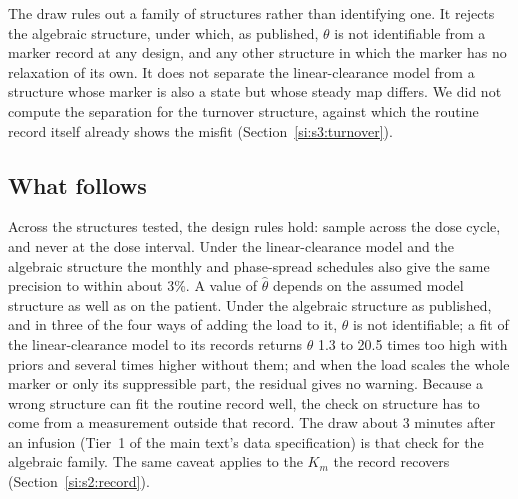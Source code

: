 The draw rules out a family of structures rather than identifying one. It rejects the algebraic
structure, under which, as published, $\theta$ is not identifiable from a marker record at any
design, and any other structure in which the marker has no relaxation of its own. It does not
separate the linear-clearance model from a structure whose marker is also a state but whose
steady map differs. We did not compute the separation for the turnover structure, against
which the routine record itself already shows the misfit
(Section~\ref{si:s3:turnover}).

\subsection{What follows}
\label{si:s3:follows}

Across the structures tested, the design rules hold: sample across the dose cycle, and never at
the dose interval. Under the linear-clearance model and the algebraic structure the monthly and
phase-spread schedules also give the same precision to within about 3\%. A value of $\hat\theta$ depends on the assumed model structure as well as on the patient.
Under the algebraic structure as published, and in three of the four ways of adding the load to
it, $\theta$ is not identifiable; a fit of the linear-clearance model to its records returns
$\hat\theta$ 1.3 to 20.5 times too high with priors and several times higher without them; and
when the load scales the whole marker or only its suppressible part, the residual gives no
warning. Because a wrong structure can fit the routine record well, the check on structure has
to come from a measurement outside that record. The draw about 3 minutes after an infusion
(Tier~1 of the main text's data specification) is that check for the algebraic family. The same
caveat applies to the $K_m$ the record recovers (Section~\ref{si:s2:record}).
